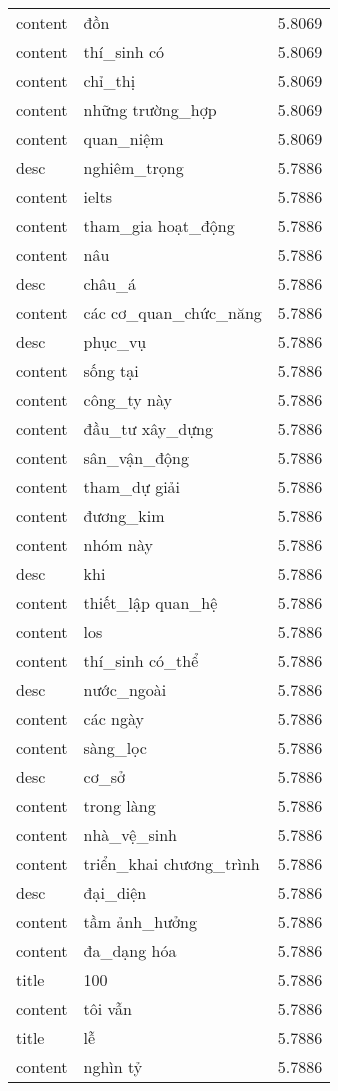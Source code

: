\documentclass{article}
\begin{document}
\begin{tabular}{lll}
content & đồn & 5.8069\\
content & thí\_sinh có & 5.8069\\
content & chỉ\_thị & 5.8069\\
content & những trường\_hợp & 5.8069\\
content & quan\_niệm & 5.8069\\
desc & nghiêm\_trọng & 5.7886\\
content & ielts & 5.7886\\
content & tham\_gia hoạt\_động & 5.7886\\
content & nâu & 5.7886\\
desc & châu\_á & 5.7886\\
content & các cơ\_quan\_chức\_năng & 5.7886\\
desc & phục\_vụ & 5.7886\\
content & sống tại & 5.7886\\
content & công\_ty này & 5.7886\\
content & đầu\_tư xây\_dựng & 5.7886\\
content & sân\_vận\_động & 5.7886\\
content & tham\_dự giải & 5.7886\\
content & đương\_kim & 5.7886\\
content & nhóm này & 5.7886\\
desc & khi & 5.7886\\
content & thiết\_lập quan\_hệ & 5.7886\\
content & los & 5.7886\\
content & thí\_sinh có\_thể & 5.7886\\
desc & nước\_ngoài & 5.7886\\
content & các ngày & 5.7886\\
content & sàng\_lọc & 5.7886\\
desc & cơ\_sở & 5.7886\\
content & trong làng & 5.7886\\
content & nhà\_vệ\_sinh & 5.7886\\
content & triển\_khai chương\_trình & 5.7886\\
desc & đại\_diện & 5.7886\\
content & tầm ảnh\_hưởng & 5.7886\\
content & đa\_dạng hóa & 5.7886\\
title & 100 & 5.7886\\
content & tôi vẫn & 5.7886\\
title & lễ & 5.7886\\
content & nghìn tỷ & 5.7886\\

\end{tabular}
\end{document}
